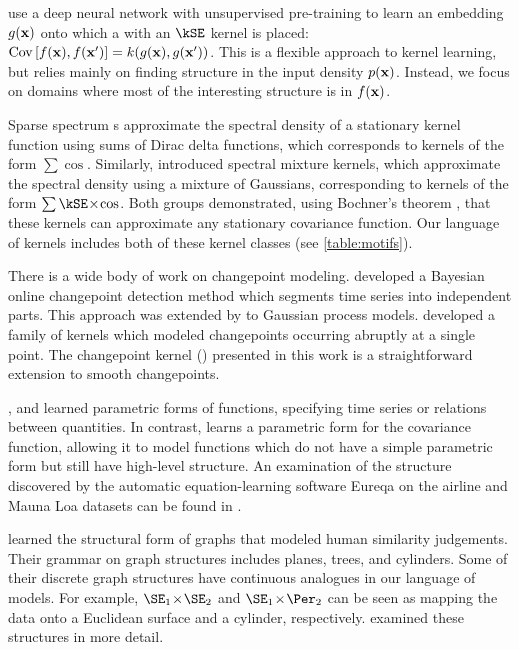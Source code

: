 \citet{salakhutdinov2008using} use a deep neural network with unsupervised pre-training to learn an embedding $g({\bf{x}})$ onto which a \gp{} with an $\kSE$ kernel is placed: ${\operatorname{Cov}{[f({\bf{x}}), f({\bf{x}}')]} = k(g({\bf{x}}), g({\bf{x}}'))}$.
This is a flexible approach to kernel learning, but relies mainly on finding structure in the input density $p({\bf{x}})$.
Instead, we focus on domains where most of the interesting structure is in $f({\bf{x}})$.

Sparse spectrum \gp{}s \citep{lazaro2010sparse} approximate the spectral density of a stationary kernel function using sums of Dirac delta functions, which corresponds to kernels of the form $\sum \cos$.
Similarly, \citet{WilAda13} introduced spectral mixture kernels, which approximate the spectral density using a mixture of Gaussians, corresponding to kernels of the form $\sum \kSE \kerntimes \cos$.
Both groups demonstrated, using Bochner's theorem \citep{bochner1959lectures}, that these kernels can approximate any stationary covariance function.
Our language of kernels includes both of these kernel classes (see \cref{table:motifs}).



There is a wide body of work on changepoint modeling.
\citet{adams2007bayesian} developed a Bayesian online changepoint detection method which segments time series into independent parts.
This approach was extended by \citet{saatcci2010gaussian} to Gaussian process models.
\citet{garnett2010sequential} developed a family of kernels which modeled changepoints occurring abruptly at a single point.
The changepoint kernel (\kCP) presented in this work is a straightforward extension to smooth changepoints.


\cite{todorovski1997declarative}, \cite{washio1999discovering} and \cite{Schmidt2009b} learned parametric forms of functions, specifying time series or relations between quantities.
In contrast, \procedurename{} learns a parametric form for the covariance function, allowing it to model functions which do not have a simple parametric form but still have high-level structure.
An examination of the structure discovered by the automatic equation-learning software Eureqa \citep{Eureqa} on the airline and Mauna Loa datasets can be found in \citet{LloDuvGroetal14}.




\citet{kemp2008discovery} learned the structural form of graphs that modeled human similarity judgements.
Their grammar on graph structures includes planes, trees, and cylinders.
Some of their discrete graph structures have continuous analogues in our language of models.
For example, $\SE_1 \kerntimes \SE_2$ and $\SE_1 \kerntimes \Per_2$ can be seen as mapping the data onto a Euclidean surface and a cylinder, respectively.
 examined these structures in more detail.

